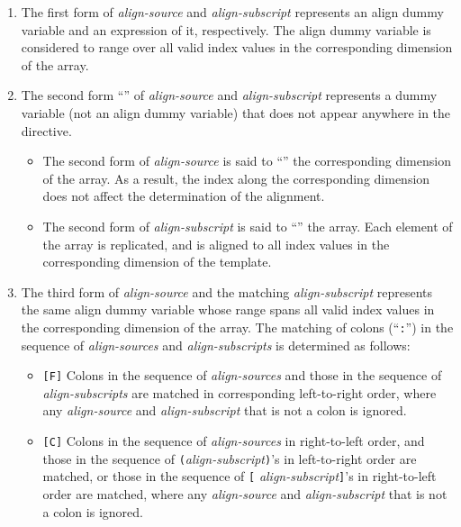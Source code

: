 \begin{enumerate}
\item The first form of {\it align-source} and {\it align-subscript}
      represents an align dummy variable and an expression of it,
      respectively. The align dummy variable is considered to range over
      all valid index values in the corresponding dimension of the array.
\item The second form ``{\tt *}'' of {\it align-source} and {\it
      align-subscript} represents a dummy variable (not an align dummy
      variable) that does not appear anywhere in the directive.
      \begin{itemize} 
       \item The second form of {\it align-source} is said to
	     ``'' the corresponding dimension of the array. As a
	     result, the index along the corresponding dimension does not
			 affect the determination of the alignment.
       \item The second form of {\it align-subscript} is said to
	     ``'' the array. Each element of the array is
	     replicated, and is aligned to all index values in the
	     corresponding dimension of the template.
      \end{itemize}
\item The third form of {\it align-source} and the matching {\it
      align-subscript} represents the same align dummy variable whose
      range spans all valid index values in the corresponding dimension
      of the array. The matching of colons (``{\tt :}'') in the sequence
      of {\it align-sources} and {\it align-subscripts} is determined
      as follows:

      \begin{itemize}
       \item \verb![F]! Colons in the sequence of {\it align-sources}
	     and those in the sequence of {\it align-subscripts} are
	     matched in corresponding left-to-right order, where any
	     {\it align-source} and {\it align-subscript} that is not a
	     colon is ignored.
       \item \verb![C]! Colons in the sequence of {\it align-sources}
			 in right-to-left order, and those in the sequence of
			 \verb|(|{\it align-subscript}\verb|)|'s in left-to-right
			 order are matched, or those in the sequence of \verb|[|{\it
			 align-subscript}\verb|]|'s in right-to-left order are
			 matched, where any {\it align-source} and {\it
			 align-subscript} that is not a colon is ignored.
      \end{itemize}


\end{enumerate}

